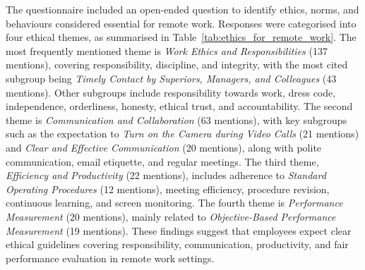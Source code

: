 \documentclass{infotel}
\begin{document}
The questionnaire included an open-ended question to identify ethics, norms, and behaviours considered essential for remote work. Responses were categorised into four ethical themes, as summarised in Table~\ref{tab:ethics_for_remote_work}. The most frequently mentioned theme is \textit{Work Ethics and Responsibilities} (137 mentions), covering responsibility, discipline, and integrity, with the most cited subgroup being \textit{Timely Contact by Superiors, Managers, and Colleagues} (43 mentions). Other subgroups include responsibility towards work, dress code, independence, orderliness, honesty, ethical trust, and accountability. The second theme is \textit{Communication and Collaboration} (63 mentions), with key subgroups such as the expectation to \textit{Turn on the Camera during Video Calls} (21 mentions) and \textit{Clear and Effective Communication} (20 mentions), along with polite communication, email etiquette, and regular meetings. The third theme, \textit{Efficiency and Productivity} (22 mentions), includes adherence to \textit{Standard Operating Procedures} (12 mentions), meeting efficiency, procedure revision, continuous learning, and screen monitoring. The fourth theme is \textit{Performance Measurement} (20 mentions), mainly related to \textit{Objective-Based Performance Measurement} (19 mentions). These findings suggest that employees expect clear ethical guidelines covering responsibility, communication, productivity, and fair performance evaluation in remote work settings.
\end{document}

